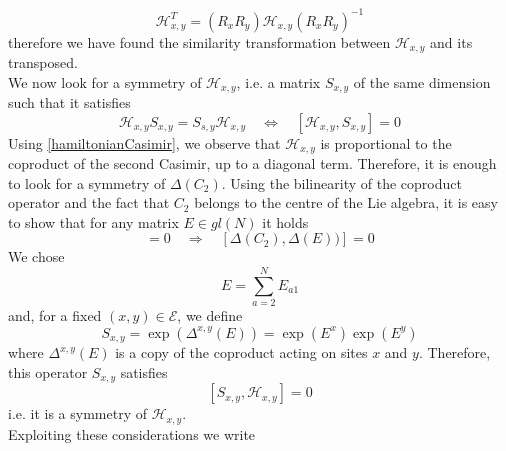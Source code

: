 \documentclass[11pt]{article}
\numberwithin{equation}{section}
\numberwithin{equation}{subsection}
\begin{document}
\begin{equation}\label{transpositionPropertyH}
    \mathcal{H}_{x,y}^{T}=\left(R_{x}R_{y}\right)\mathcal{H}_{x,y}\left(R_{x}R_{y}\right)^{-1}
\end{equation}
therefore we have found the similarity transformation between $\mathcal{H}_{x,y}$ and its transposed. \\
We now look for a symmetry of $\mathcal{H}_{x,y}$, i.e. a matrix $S_{x,y}$ of the same dimension such that it satisfies 
\begin{equation}
	\mathcal{H}_{x,y}S_{x,y}=S_{s,y}\mathcal{H}_{x,y}\quad \Leftrightarrow \quad [\mathcal{H}_{x,y},S_{x,y}]=0
\end{equation}
Using \eqref{hamiltonianCasimir}, we observe that $\mathcal{H}_{x,y}$ is proportional to the coproduct of the second Casimir, up to a diagonal term. Therefore, it is enough to look for a symmetry of $\Delta (C_{2})$. Using the bilinearity of the coproduct operator and the fact that $C_{2}$ belongs to the centre of the Lie algebra, it is easy to show that for any matrix $E\in gl(N)$ it holds
\begin{equation}
	[C_{2},E]=0\quad \Rightarrow\quad \left[\Delta (C_{2}),\Delta(E)) \right]=0
\end{equation}
We chose 
\begin{equation}
	E=\sum_{a=2}^{N}E_{a1}
\end{equation}
and, for a fixed $(x,y)\in \mathcal{E}$, we define
\begin{equation}
	S_{x,y}=\exp{(\Delta^{x,y}(E))}=\exp{(E^{x})}\exp{(E^{y})}
\end{equation}
where $\Delta^{x,y}(E)$ is a copy of the coproduct acting on sites $x$ and $y$. Therefore, this operator $S_{x,y}$ satisfies
\begin{equation}\label{symmetryH}
	\left[S_{x,y},\mathcal{H}_{x,y}\right]=0
\end{equation}
i.e. it is a symmetry of $\mathcal{H}_{x,y}$. \\ Exploiting these considerations we write
\end{document}
